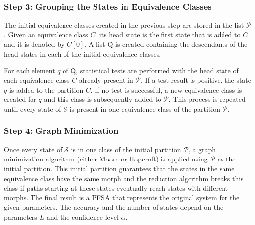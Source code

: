 {%

\subsubsection{Step 3: Grouping the States in Equivalence Classes}

The initial equivalence classes created in the previous step are stored in the list $\mathcal{P}$. Given an equivalence class $C$, its head state is the first state that is added to $C$ and it is denoted by $C[0]$. A list \~{Q} is created containing the descendants of the head states in each of the initial equivalence classes.  

For each element $q$ of \~{Q}, statistical tests are performed with the head state of each equivalence class $C$ already present in $\mathcal{P}$. If a test result is positive, the state $q$ is added to the partition $C$. If no test is successful, a new equivalence class is created for $q$ and this class is subsequently added to $\mathcal{P}$. This process is repeated until every state of $\mathcal{S}$ is present in one equivalence class of the partition $\mathcal{P}$.

\subsubsection{Step 4: Graph Minimization}

  Once every state of $\mathcal{S}$ is in one class of the initial partition $\mathcal{P}$, a graph minimization algorithm (either Moore or Hopcroft) is applied using $\mathcal{P}$ as the initial partition. This initial partition guarantees that the states in the same equivalence class have the same morph and the reduction algorithm breaks this class if paths starting at these states eventually reach states with different morphs.  The final result is a PFSA that represents the original system for the given parameters. The accuracy and the number of states depend on the parameters $L$ and the confidence level $\alpha$.  

}
